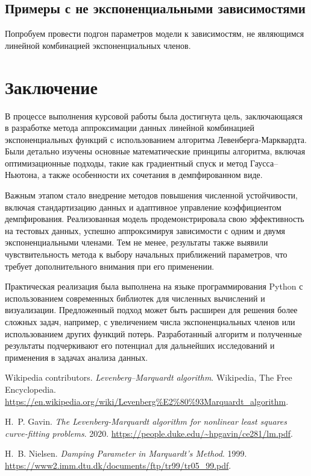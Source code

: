 \subsection{Примеры с не экспоненциальными зависимостями}

Попробуем провести подгон параметров модели к зависимостям, не являющимся линейной комбинацией экспоненциальных членов.

\newpage
\section*{Заключение}

В процессе выполнения курсовой работы была достигнута цель, заключающаяся в разработке метода аппроксимации данных линейной комбинацией экспоненциальных функций с использованием алгоритма Левенберга-Марквардта. Были детально изучены основные математические принципы алгоритма, включая оптимизационные подходы, такие как градиентный спуск и метод Гаусса–Ньютона, а также особенности их сочетания в демпфированном виде.

Важным этапом стало внедрение методов повышения численной устойчивости, включая стандартизацию данных и адаптивное управление коэффициентом демпфирования. Реализованная модель продемонстрировала свою эффективность на тестовых данных, успешно аппроксимируя зависимости с одним и двумя экспоненциальными членами. Тем не менее, результаты также выявили чувствительность метода к выбору начальных приближений параметров, что требует дополнительного внимания при его применении.

Практическая реализация была выполнена на языке программирования Python с использованием современных библиотек для численных вычислений и визуализации. Предложенный подход может быть расширен для решения более сложных задач, например, с увеличением числа экспоненциальных членов или использованием других функций потерь. Разработанный алгоритм и полученные результаты подчеркивают его потенциал для дальнейших исследований и применения в задачах анализа данных.

\newpage

\begin{thebibliography}{99}
	Wikipedia contributors.
	\emph{Levenberg--Marquardt algorithm}.
	Wikipedia, The Free Encyclopedia.
	\url{https://en.wikipedia.org/wiki/Levenberg%E2%80%93Marquardt_algorithm}.

	H.~P. Gavin.
	\emph{The Levenberg-Marquardt algorithm for nonlinear least squares curve-fitting problems}.
	2020.
	\url{https://people.duke.edu/~hpgavin/ce281/lm.pdf}.

	H.~B. Nielsen.
	\emph{Damping Parameter in Marquardt's Method}.
	1999.
	\url{https://www2.imm.dtu.dk/documents/ftp/tr99/tr05_99.pdf}.
\end{thebibliography}

